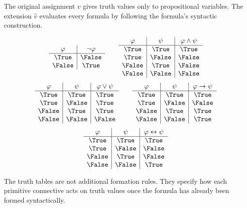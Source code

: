 \begin{remark*}[Interpretation]
The original assignment \(v\) gives truth values only to propositional variables.
The extension \(\widehat v\) evaluates every formula by following the formula's
syntactic construction.
\end{remark*}

\begin{remark*}[Examples]
\[
\begin{array}{c|c}
\varphi & \neg\varphi\\
\hline
\True & \False\\
\False & \True
\end{array}
\qquad
\begin{array}{c|c|c}
\varphi & \psi & \varphi\land\psi\\
\hline
\True & \True & \True\\
\True & \False & \False\\
\False & \True & \False\\
\False & \False & \False
\end{array}
\]
\[
\begin{array}{c|c|c}
\varphi & \psi & \varphi\lor\psi\\
\hline
\True & \True & \True\\
\True & \False & \True\\
\False & \True & \True\\
\False & \False & \False
\end{array}
\qquad
\begin{array}{c|c|c}
\varphi & \psi & \varphi\to\psi\\
\hline
\True & \True & \True\\
\True & \False & \False\\
\False & \True & \True\\
\False & \False & \True
\end{array}
\]
\[
\begin{array}{c|c|c}
\varphi & \psi & \varphi\leftrightarrow\psi\\
\hline
\True & \True & \True\\
\True & \False & \False\\
\False & \True & \False\\
\False & \False & \True
\end{array}
\]
\end{remark*}

\begin{remark*}[Examples]
The truth tables are not additional formation rules. They specify how each
primitive connective acts on truth values once the formula has already been
formed syntactically.
\end{remark*}

